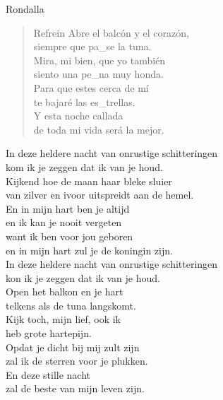 \begin{song}[vals]{Rondalla}
\begin{verse}{Refrein}
Abre el balcón y el corazón,\\
siempre que pa\_se \hspace{1em}\hspace{1em} la tuna.\\
\chord{}Mira, mi bien, que yo tambi\'{e}n\\
siento una pe\_na \hspace{1em}\hspace{1em} muy honda.\\
\chord{}Para que estes cerca de m\'{i}\\
te bajar\'{e} las es\_trellas.\\
Y esta noche callada\\
de toda mi vida ser\'{a} la mejor.\hspace{4em} 
\end{verse}

\end{song}

\begin{translation}
In deze heldere nacht van onrustige schitteringen\\
kom ik je zeggen dat ik van je houd.\\
Kijkend hoe de maan haar bleke sluier\\
van zilver en ivoor uitspreidt aan de hemel.\\\vspace{1em}
En in mijn hart ben je altijd\\
en ik kan je nooit vergeten\\
want ik ben voor jou geboren\\
en in mijn hart zul je de koningin zijn.\\\vspace{1em}
In deze heldere nacht van onrustige schitteringen\\
kon ik je zeggen dat ik van je houd.\\\vspace{1em}
Open het balkon en je hart\\
telkens als de tuna langskomt.\\
Kijk toch, mijn lief, ook ik\\
heb grote hartepijn.\\
Opdat je dicht bij mij zult zijn\\
zal ik de sterren voor je plukken.\\
En deze stille nacht\\
zal de beste van mijn leven zijn.
\end{translation}

